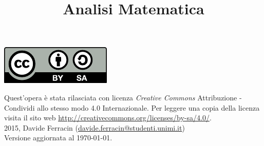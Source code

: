 \documentclass[a4paper]{book}
\title{
	{\sffamily\fontsize{35}{42}\selectfont Analisi Matematica}
}
\author{}
\date{}
\begin{document}
\maketitle

\null %
\vfill %
\hspace*{-1.5em}\includegraphics[scale=.7]{by-sa-icon.pdf}
\begin{flushleft}
	Quest'opera è stata rilasciata con licenza \emph{Creative Commons} Attribuzione - Condividi allo stesso modo 4.0 Internazionale. Per leggere una copia della licenza visita il sito web \url{http://creativecommons.org/licenses/by-sa/4.0/}.\\
	2015, Davide Ferracin (\href{mailto:davide.ferracin@studenti.unimi.it}{\ttfamily davide.ferracin@studenti.unimi.it})\\[1cm]
	Versione aggiornata al \today.
\end{flushleft}

\part{}
\startcontents[parts]







\stopcontents[parts]
\part{}
\startcontents[parts]





\stopcontents[parts]
\part{}
\startcontents[parts]




\stopcontents[parts]

\cleardoublepage
{}
{}
\nocite{*}
\printbibliography

\cleardoublepage
{}
\tableofcontents
\end{document}
